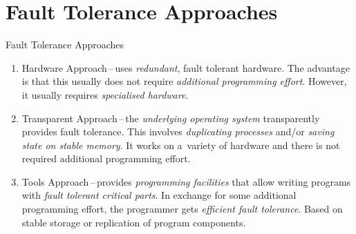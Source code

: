\documentclass[
    10pt, hyperref={unicode, colorlinks, hypertexnames=false,
    linkcolor=white}, aspectratio=169
]{beamer}
\begin{document}
\section{Fault Tolerance Approaches}
\begin{frame}{Fault Tolerance Approaches}
    \begin{enumerate}\setlength\itemsep{2em}
        \item
            \alert{Hardware Approach}\,--\,uses \emph{redundant},
            fault tolerant hardware. The advantage is that this
            usually does not require \emph{additional programming
            effort}. However, it usually requires \emph{specialised
            hardware}.

        \item
            \alert{Transparent Approach}\,--\,the \emph{underlying
            operating system} transparently provides fault tolerance.
            This involves \emph{duplicating processes} and/or
            \emph{saving state on stable memory}. It works on
            a~variety of hardware and there is not required
            additional programming effort.

        \item
            \alert{Tools Approach}\,--\,provides \emph{programming
            facilities} that allow writing programs with \emph{fault
            tolerant critical parts}. In exchange for some
            additional programming effort, the programmer gets
            \emph{efficient fault tolerance}. Based on stable
            storage or replication of program components.
    \end{enumerate}
\end{frame}
\end{document}
